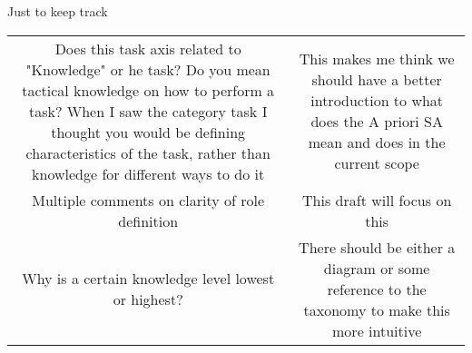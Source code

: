 \documentclass[letterpaper, 10 pt, conference]{ieeeconf}  %
\theoremstyle{definition}
\begin{document}
Just to keep track

\begin{center}
  \begin{tabular}{c | c}
    \hline
    Does this task axis related to "Knowledge" or he task? Do you mean tactical
    knowledge on how to perform a task? When I saw the category task I thought
    you would be defining characteristics of the task, rather than knowledge for
    different ways to do it & This makes me think we should have a better
    introduction to what does the A priori SA mean and does in the current scope
    \\
    Multiple comments on clarity of role definition & This draft will focus on
    this \\
    Why is a certain knowledge level lowest or highest? & There should be either
    a diagram or some reference to the taxonomy to make this more intuitive \\
  \end{tabular}
\end{center}
\end{document}
